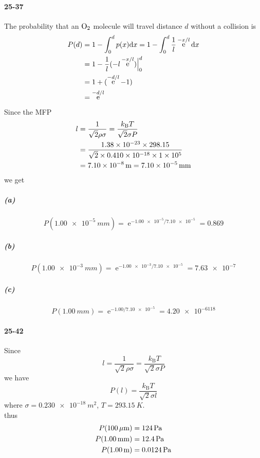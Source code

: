 \documentclass[a4paper]{article}
\DeclareMathOperator{\e}{\mathrm{e}}
\newcommand{\kB}{k_\mathrm{B}}
\newcommand{\ex}[1]{\paragraph{#1}}
\newcommand{\subex}[1]{\subparagraph{#1}}
\numberwithin{equation}{section}
\begin{document}
\ex{25-37}
The probability that an $ \ce{O_2} $ molecule will travel distance $ d $ without a collision is
\begin{align}\label{key}
P(d) &= 1 - \int_0^d p(x)\dd x = 1 - \int_0^d \dfrac{1}{l}\e^{-x/l}\dd x \notag\\
&= 1 - \dfrac{1}{l}(-l\e^{-x/l})\Big|_0^d \notag\\
&= 1 + (\e^{-d/l} - 1) \notag\\
&= \e^{-d/l}
\end{align}
Since the MFP
\begin{align}\label{key}
l &= \dfrac{1}{\sqrt{2}\rho\sigma} = \dfrac{\kB T}{\sqrt{2}\sigma P} \notag\\
&= \dfrac{\num{1.38e-23}\times 298.15}{\sqrt{2}\times\num{0.410e-18}\times\num{1e5}} \notag\\
&= \SI{7.10e-8}{m} = \SI{7.10e-5}{mm}
\end{align}
we get
\subex{(a)}
\begin{equation}\label{key}
P(\SI{1.00e-5}{mm}) = \e^{-\num{1.00e-5}/\num{7.10e-5}} = 0.869
\end{equation}
\subex{(b)}
\begin{equation}\label{key}
P(\SI{1.00e-3}{mm}) = \e^{-\num{1.00e-3}/\num{7.10e-5}} = \num{7.63e-7}
\end{equation}
\subex{(c)}
\begin{equation}\label{key}
P(\SI{1.00}{mm}) = \e^{-\num{1.00}/\num{7.10e-5}} = \num{4.20e-6118}
\end{equation}

\ex{25-42}
Since 
\begin{equation}\label{key}
l = \dfrac{1}{\sqrt{2}\rho\sigma} = \dfrac{\kB T}{\sqrt{2}\sigma P} 
\end{equation}
we have
\begin{equation}\label{key}
P(l) = \dfrac{\kB T}{\sqrt{2}\sigma l}
\end{equation}
where $ \sigma=\SI{0.230e-18}{m^2} $, $ T=\SI{293.15}{K} $.\\
thus
\begin{align}
P(\SI{100}{\mu m}) &= \SI{124}{Pa} \notag\\
P(\SI{1.00}{mm}) &= \SI{12.4}{Pa} \notag\\
P(\SI{1.00}{m}) &= \SI{0.0124}{Pa} 
\end{align}
\end{document}
